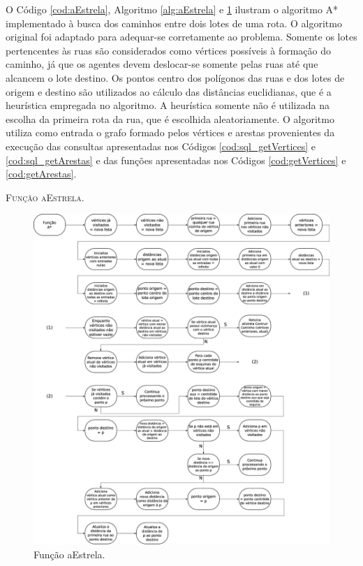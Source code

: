 O Código \ref{cod:aEstrela}, Algoritmo \ref{alg:aEstrela} e \ref{fig:aEstrela} ilustram o algoritmo A* implementado à busca dos caminhos entre dois lotes de uma rota. O algoritmo original foi adaptado para adequar-se corretamente ao problema. Somente os lotes pertencentes às ruas são considerados como vértices possíveis à formação do caminho, já que os agentes devem deslocar-se somente pelas ruas até que alcancem o lote destino. Os pontos centro dos polígonos das ruas e dos lotes de origem e destino são utilizados ao cálculo das distâncias euclidianas, que é a heurística empregada no algoritmo. A heurística somente não é utilizada na escolha da primeira rota da rua, que é escolhida aleatoriamente. O algoritmo utiliza como entrada o grafo formado pelos vértices e arestas provenientes da execução das consultas apresentadas nos Códigos \ref{cod:sql_getVertices} e \ref{cod:sql_getArestas} e das funções apresentadas nos Códigos \ref{cod:getVertices} e \ref{cod:getArestas}.



\begin{algorithm}[H]
   \SetAlgoLined   
   
   \caption{\textsc{Função aEstrela.}}
   \label{alg:aEstrela}
\end{algorithm}

\begin{figure}[H]
  \centering
  \includegraphics[width=1\textwidth]{Figuras/Simula/Fluxos/aEstrela.eps}
  \caption{Função aEstrela.}
  \label{fig:aEstrela}
\end{figure} 

